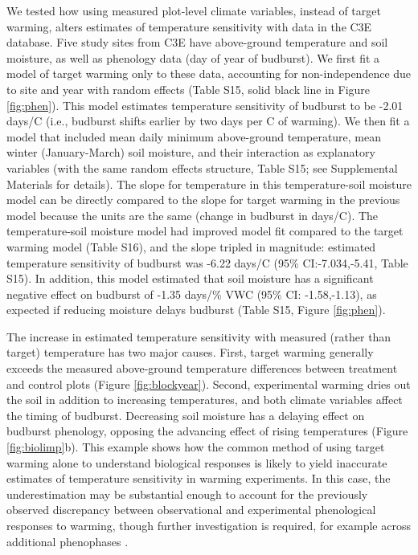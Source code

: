 \documentclass{article}
\begin{document}
\par We tested how using measured plot-level climate variables, instead of target warming, alters estimates of temperature sensitivity with data in the C3E database. Five study sites from C3E have above-ground temperature and soil moisture, as well as phenology data (day of year of budburst). We first fit a model of target warming only to these data, accounting for non-independence due to site and year with random effects (Table S15, solid black line in Figure \ref{fig:phen}). This model estimates temperature sensitivity of budburst to be -2.01 days/\degree C (i.e., budburst shifts earlier by two days per \degree C of warming). We then fit a model that included mean daily minimum above-ground temperature, mean winter (January-March) soil moisture, and their interaction as explanatory variables (with the same random effects structure, Table S15; see Supplemental Materials for details). The slope for temperature in this temperature-soil moisture model can be directly compared to the slope for target warming in the previous model because the units are the same (change in budburst in days/\degree C). The temperature-soil moisture model had improved model fit compared to the target warming model (Table S16), and the slope tripled in magnitude: estimated temperature sensitivity of budburst was -6.22 days/\degree C (95\% CI:-7.034,-5.41, Table S15). In addition, this model estimated that soil moisture has a significant negative effect on budburst of -1.35 days/\% VWC (95\% CI: -1.58,-1.13), as expected if reducing moisture delays budburst (Table S15, Figure \ref{fig:phen}).


\par The increase in estimated temperature sensitivity with measured (rather than target) temperature has two major causes. First, target warming generally exceeds the measured above-ground temperature differences between treatment and control plots (Figure \ref{fig:blockyear}). Second, experimental warming dries out the soil in addition to increasing temperatures, and both climate variables affect the timing of budburst. %
Decreasing soil moisture has a delaying effect on budburst phenology, opposing the advancing effect of rising temperatures (Figure \ref{fig:biolimp}b). This example shows how the common method of using target warming alone to understand biological responses is likely to yield inaccurate estimates of temperature sensitivity in warming experiments. In this case, the underestimation may be substantial enough to account for the previously observed discrepancy between observational and experimental phenological responses to warming, though further investigation is required, for example across additional phenophases \citep{wolkovich2012}. 
\end{document}
